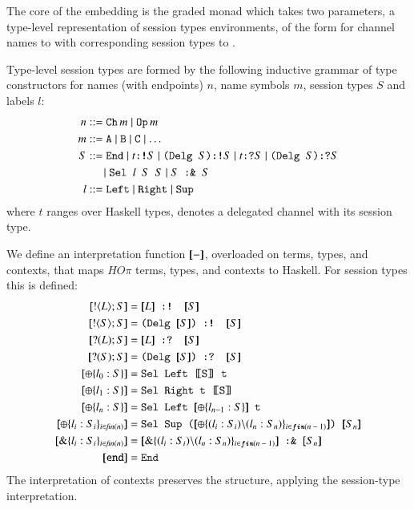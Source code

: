 The core of the embedding is the graded monad  which
takes two parameters, a type-level representation of session types
environments, of the form  for channel names
 to  with corresponding session types  to . 

Type-level session types are formed by the following inductive grammar of 
type constructors for names (with endpoints) $n$, name symbols $m$, session types $S$ and
labels $l$:
\begin{align*}
n & ::= \hask{Ch} \, m \mid \hask{Op} \, m \\
m & ::= \hask{A} \mid \hask{B} \mid \hask{C} \mid \ldots \\
S & ::= \hask{End} \mid \hask{$t$:!$S$} \mid \hask{(Delg $S$):!$S$} \mid \hask{$t$:?$S$} \mid 
\hask{(Delg $S$):?$S$}\\
 & \quad\; \mid \hask{Sel $l$ $S$ $S$} \mid \hask{$S$ :\& $S$} \\
l & ::= \hask{Left} \mid \hask{Right} \mid \hask{Sup}
\end{align*}
where $t$ ranges over Haskell types, 
 denotes a delegated channel with its session type.

\newcommand{\interp}[1]{\map{#1}}

We define an interpretation function $\interp{-}$, overloaded on terms, types, and contexts,
that maps $HO\pi$ terms, types, and contexts to Haskell.  For session types this is defined:
\begin{align*}
\interp{\btout{L} S} & = \hask{$\interp{L}$ :! $\interp{S}$} \\
\interp{\btout{S} S} & = \hask{(Delg $\interp{S}$) :! $\interp{S}$} \\
\interp{\btinp{L} S} & = \hask{$\interp{L}$ :? $\interp{S}$} \\
\interp{\btinp{S} S} & = \hask{(Delg $\interp{S}$) :? $\interp{S}$} \\
\interp{\btsel{l_0:S}} & = \hask{Sel Left \interp{S} t} \\
\interp{\btsel{l_1:S}} & = \hask{Sel Right t \interp{S}} \\
\interp{\btsel{l_n:S}} & = \hask{Sel Left $\interp{\btsel{l_{n-1}:S}}$ t} \\
\interp{\btsel{l_i:S_i}_{i \in \textit{fin$(n)$}}} & = \hask{Sel Sup ($\interp{\btsel{(l_i : S_i) \backslash (l_n : S_n)}_{i \in \textit{fin$(n-1)$}}}$) $\interp{S_n}$} \\
\interp{\btbra{l_i:S_i}_{i \in \textit{fin$(n)$}}} & = \hask{$\interp{\btbra{(l_i : S_i) \backslash (l_n : S_n)}_{i \in \textit{fin$(n-1)$}}}$ :\& $\interp{S_n}$} \\
\interp{\texttt{end}} & = \hask{End} 
\end{align*}
The interpretation of contexts preserves the structure, applying the session-type interpretation.

